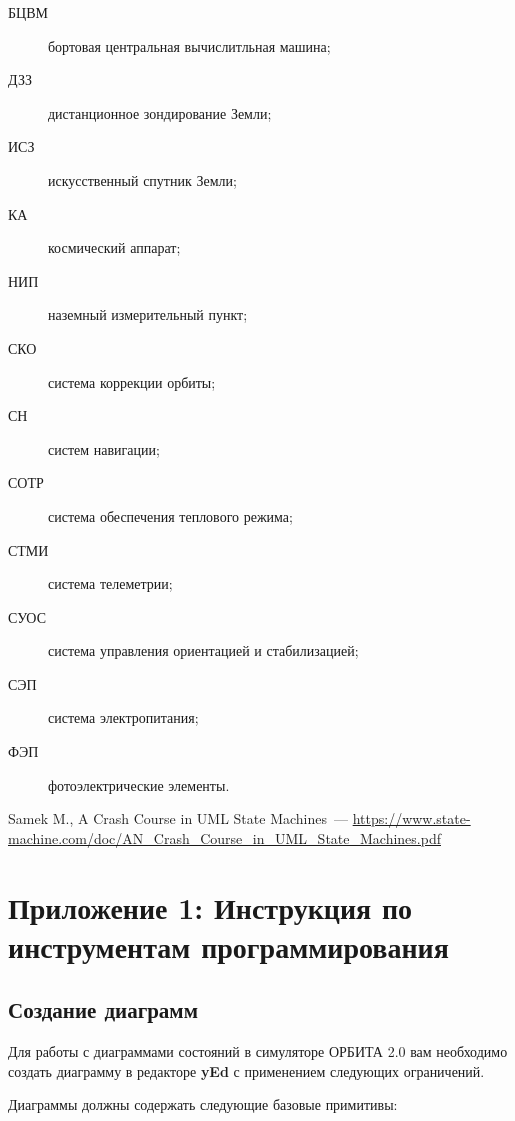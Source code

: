 \documentclass[12pt,a4paper]{article}
\begin{document}
\begin{description}
\item[БЦВМ] бортовая центральная вычислитльная машина;
\item[ДЗЗ] дистанционное зондирование Земли;
\item[ИСЗ] искусственный спутник Земли;
\item[КА] космический аппарат;
\item[НИП] наземный измерительный пункт;
\item[СКО] система коррекции орбиты;
\item[СН] систем навигации;
\item[СОТР] система обеспечения теплового режима;
\item[СТМИ] система телеметрии;
\item[СУОС] система управления ориентацией и стабилизацией;
\item[СЭП] система электропитания;
\item[ФЭП] фотоэлектрические элементы.
\end{description}

\begin{thebibliography}{2}
 Samek M., A Crash Course in UML State Machines~---
  \url{https://www.state-machine.com/doc/AN_Crash_Course_in_UML_State_Machines.pdf}
\end{thebibliography}

\clearpage
\section*{Приложение 1: Инструкция по инструментам программирования}

\subsection*{Создание диаграмм}

Для работы с диаграммами состояний в симуляторе ОРБИТА 2.0 вам необходимо создать
диаграмму в редакторе \textbf{yEd} с применением следующих ограничений.

Диаграммы должны содержать следующие базовые примитивы:
\end{document}

